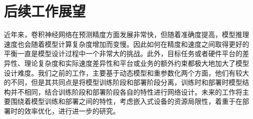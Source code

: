 \section{后续工作展望}

近年来，卷积神经网络在预测精度方面发展非常快，但随着准确度提高，模型推理速度也会随着模型计算复杂度增加而变慢。因此如何在精度和速度之间取得更好的平衡一直是模型设计过程中一个非常大的挑战。此外，目标任务或者硬件平台的差异性、理论复杂度和实际速度差异性和平台或业务的额外约束都极大地加大了模型设计难度。我们之前的工作，主要基于动态模型和重参数化两个方面，他们有较大的不同，但是其共同点是将模型训练阶段和部署阶段分离，训练时和部署时模型结构并不相同，结合训练阶段和部署阶段各自的特性进行网络设计。未来的工作将主要围绕着模型训练和部署之间的特性，考虑嵌入式设备的资源局限性，着重于在部署时的效率优化，进行进一步的研究。





